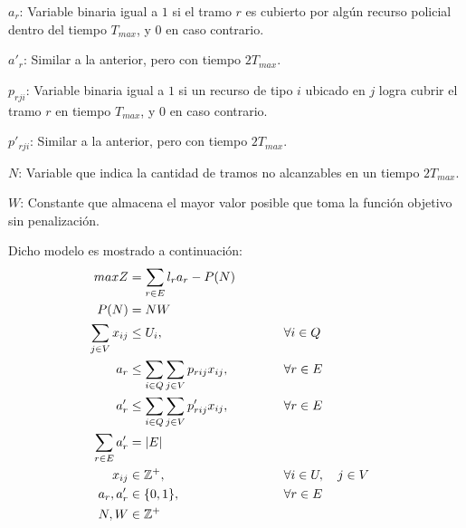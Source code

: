 $a_{r}$: Variable binaria igual a $1$ si el tramo $r$ es cubierto por algún recurso policial dentro del tiempo $T_{max}$, y $0$ en caso contrario.

$a'_{r}$: Similar a la anterior, pero con tiempo $2T_{max}$.

$p_{rji}$: Variable binaria igual a $1$ si un recurso de tipo $i$ ubicado en $j$ logra cubrir el tramo $r$ en tiempo $T_{max}$, y $0$ en caso contrario.

$p'_{rji}$: Similar a la anterior, pero con tiempo $2T_{max}$.

$N$: Variable que indica la cantidad de tramos no alcanzables en un tiempo $2T_{max}$.

$W$: Constante que almacena el mayor valor posible que toma la función objetivo sin penalización.

Dicho modelo es mostrado a continuación:
\begin{alignat}{2}
    maxZ\label{eq:optimization-funtion}
    &= \sum_{r \in E} l_{r}a_{r} - P(N)\\
    P(N)\label{eq:penalization}
    &= NW\\
    \sum_{j \in V} x_{ij}\label{eq:total-resource}
    &\leq U_{i}, 
    &&\tab\forall i \in Q\\
    a_{r}\label{eq:p-resource}
    &\leq \sum_{i \in Q}\sum_{j \in V} p_{rij}x_{ij}, 
    &&\tab\forall r \in E\\
    a'_{r}\label{eq:pprime-resource}
    &\leq \sum_{i \in Q}\sum_{j \in V} p'_{rij}x_{ij}, 
    &&\tab\forall r \in E\\
    \sum_{r \in E} a'_{r}\label{eq:all-edges}
    &= |E|\\
    x_{ij}\label{eq:xvariable}
    &\in \mathbb{Z^{+}}, 
    &&\tab\forall i \in U, \quad j \in V\\
    a_{r}, a'_{r}\label{eq:binaries} 
    &\in \{0,1\}, 
    &&\tab\forall r \in E\\
    N, W\label{eq:penal-variables} 
    &\in \mathbb{Z^{+}}
\end{alignat}

